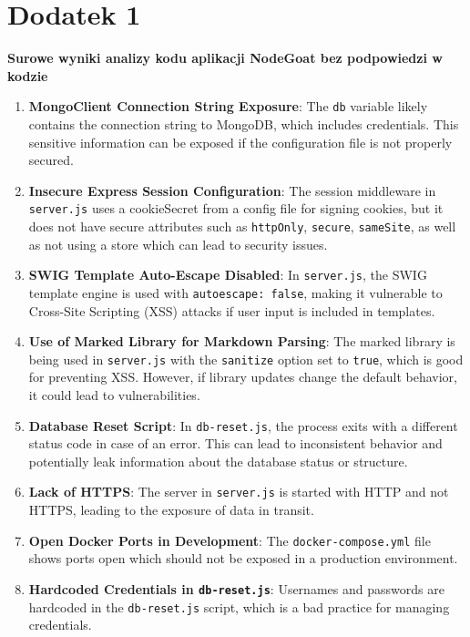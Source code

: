 \chapter{Dodatek 1}\label{app1}

{\large\textbf{Surowe wyniki analizy kodu aplikacji NodeGoat bez podpowiedzi w kodzie}}
\normalsize
\begin{enumerate}
  \def\labelenumi{\arabic{enumi}.}
  \item
    \textbf{MongoClient Connection String Exposure}: The \texttt{db}
    variable likely contains the connection string to MongoDB, which
    includes credentials. This sensitive information can be exposed if the
    configuration file is not properly secured.
  \item
    \textbf{Insecure Express Session Configuration}: The session
    middleware in \texttt{server.js} uses a cookieSecret from a config
    file for signing cookies, but it does not have secure attributes such
    as \texttt{httpOnly}, \texttt{secure}, \texttt{sameSite}, as well as
    not using a store which can lead to security issues.
  \item
    \textbf{SWIG Template Auto-Escape Disabled}: In \texttt{server.js},
    the SWIG template engine is used with \texttt{autoescape:\ false},
    making it vulnerable to Cross-Site Scripting (XSS) attacks if user
    input is included in templates.
  \item
    \textbf{Use of Marked Library for Markdown Parsing}: The marked
    library is being used in \texttt{server.js} with the \texttt{sanitize}
    option set to \texttt{true}, which is good for preventing XSS.
    However, if library updates change the default behavior, it could lead
    to vulnerabilities.
  \item
    \textbf{Database Reset Script}: In \texttt{db-reset.js}, the process
    exits with a different status code in case of an error. This can lead
    to inconsistent behavior and potentially leak information about the
    database status or structure.
  \item
    \textbf{Lack of HTTPS}: The server in \texttt{server.js} is started
    with HTTP and not HTTPS, leading to the exposure of data in transit.
  \item
    \textbf{Open Docker Ports in Development}: The
    \texttt{docker-compose.yml} file shows ports open which should not be
    exposed in a production environment.
  \item
    \textbf{Hardcoded Credentials in \texttt{db-reset.js}}: Usernames and
    passwords are hardcoded in the \texttt{db-reset.js} script, which is a
    bad practice for managing credentials.
  \end{enumerate}
  
